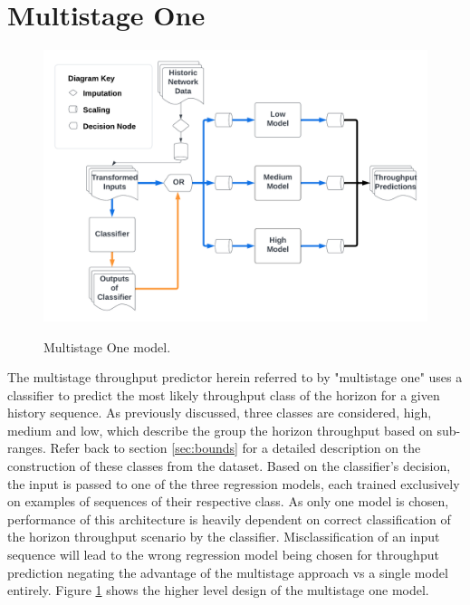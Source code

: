\section{Multistage One}
\begin{figure}[h]
\centering
\includegraphics[scale=0.15]{Multistage One.png}
\label{fig:multistage_one}
\caption{Multistage One model.}
\end{figure}

The multistage throughput predictor herein referred to by "multistage one" uses a classifier to predict the most likely throughput class of the horizon for a given history sequence. As previously discussed, three classes are considered, high, medium and low, which describe the group the horizon throughput based on sub-ranges. Refer back to section \ref{sec:bounds} for a detailed description on the construction of these classes from the dataset. Based on the classifier's decision, the input is passed to one of the three regression models, each trained exclusively on examples of sequences of their respective class. As only one model is chosen, performance of this architecture is heavily dependent on correct classification of the horizon throughput scenario by the classifier. Misclassification of an input sequence will lead to the wrong regression model being chosen for throughput prediction negating the advantage of the multistage approach vs a single model entirely. Figure \ref{fig:multistage_one} shows the higher level design of the multistage one model.

